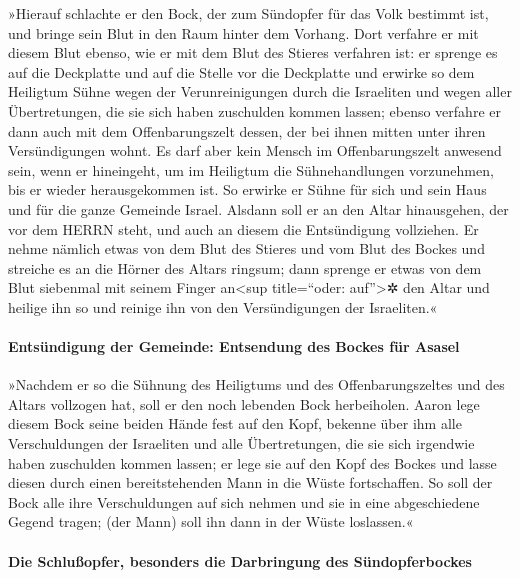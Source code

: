 »Hierauf schlachte er den Bock, der zum Sündopfer für das
Volk bestimmt ist, und bringe sein Blut in den Raum hinter dem Vorhang.
Dort verfahre er mit diesem Blut ebenso, wie er mit dem Blut des Stieres
verfahren ist: er sprenge es auf die Deckplatte und auf die Stelle vor
die Deckplatte und erwirke so dem Heiligtum Sühne wegen
der Verunreinigungen durch die Israeliten und wegen aller Übertretungen,
die sie sich haben zuschulden kommen lassen; ebenso verfahre er dann
auch mit dem Offenbarungszelt dessen, der bei ihnen mitten unter ihren
Versündigungen wohnt. Es darf aber kein Mensch im
Offenbarungszelt anwesend sein, wenn er hineingeht, um im Heiligtum die
Sühnehandlungen vorzunehmen, bis er wieder herausgekommen ist. So
erwirke er Sühne für sich und sein Haus und für die ganze Gemeinde
Israel. Alsdann soll er an den Altar hinausgehen, der vor
dem HERRN steht, und auch an diesem die Entsündigung vollziehen. Er
nehme nämlich etwas von dem Blut des Stieres und vom Blut des Bockes und
streiche es an die Hörner des Altars ringsum; dann
sprenge er etwas von dem Blut siebenmal mit seinem Finger
an\textless sup title=``oder: auf''\textgreater✲ den Altar und heilige
ihn so und reinige ihn von den Versündigungen der Israeliten.«

\hypertarget{entsuxfcndigung-der-gemeinde-entsendung-des-bockes-fuxfcr-asasel}{%
\paragraph{Entsündigung der Gemeinde: Entsendung des Bockes für
Asasel}\label{entsuxfcndigung-der-gemeinde-entsendung-des-bockes-fuxfcr-asasel}}

»Nachdem er so die Sühnung des Heiligtums und des
Offenbarungszeltes und des Altars vollzogen hat, soll er den noch
lebenden Bock herbeiholen. Aaron lege diesem Bock seine
beiden Hände fest auf den Kopf, bekenne über ihm alle Verschuldungen der
Israeliten und alle Übertretungen, die sie sich irgendwie haben
zuschulden kommen lassen; er lege sie auf den Kopf des Bockes und lasse
diesen durch einen bereitstehenden Mann in die Wüste fortschaffen.
So soll der Bock alle ihre Verschuldungen auf sich nehmen
und sie in eine abgeschiedene Gegend tragen; (der Mann) soll ihn dann in
der Wüste loslassen.«

\hypertarget{die-schluuxdfopfer-besonders-die-darbringung-des-suxfcndopferbockes}{%
\paragraph{Die Schlußopfer, besonders die Darbringung des
Sündopferbockes}\label{die-schluuxdfopfer-besonders-die-darbringung-des-suxfcndopferbockes}}

